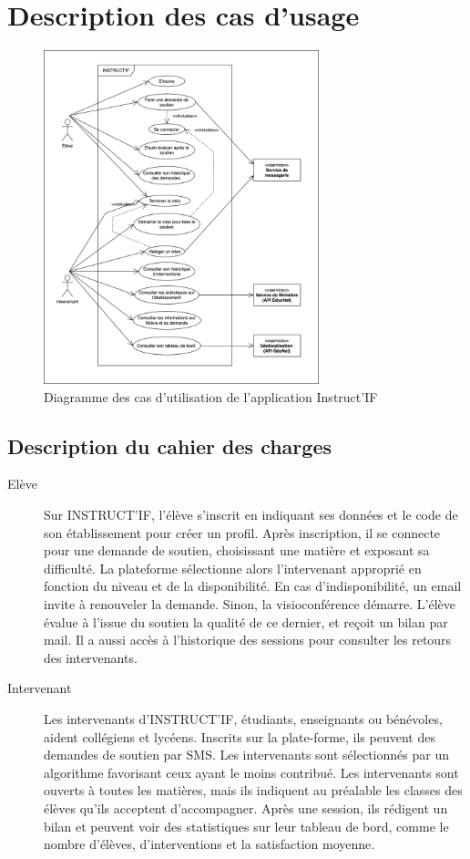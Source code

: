 \section{Description des cas d'usage}

\begin{figure}[H]
    \centering
    \includegraphics[width=8cm]{usercase.png}
    \caption{Diagramme des cas d'utilisation de l'application Instruct'IF}
    \label{usecase}
\end{figure}

\subsection{Description du cahier des charges}
\begin{description}
    \item[Elève] 
    Sur INSTRUCT'IF, l'élève s'inscrit en indiquant ses données et le code de son établissement pour créer un profil. Après inscription, il se connecte pour une demande de soutien, choisissant une matière et exposant sa difficulté. La plateforme sélectionne alors l'intervenant approprié en fonction du niveau et de la disponibilité. En cas d'indisponibilité, un email invite à renouveler la demande. Sinon, la visioconférence démarre. L'élève évalue à l'issue du soutien la qualité de ce dernier, et reçoit un bilan par mail. Il a aussi accès à l'historique des sessions pour consulter les retours des intervenants.\newline
    \item[Intervenant] Les intervenants d'INSTRUCT'IF, étudiants, enseignants ou bénévoles, aident collégiens et lycéens. Inscrits sur la plate-forme, ils peuvent des demandes de soutien par SMS. Les intervenants sont sélectionnés par un algorithme favorisant ceux ayant le moins contribué. Les intervenants sont ouverts à toutes les matières, mais ils indiquent au préalable les classes des élèves qu'ils acceptent d'accompagner. Après une session, ils rédigent un bilan et peuvent voir des statistiques sur leur tableau de bord, comme le nombre d'élèves, d'interventions et la satisfaction moyenne.
\end{description}

